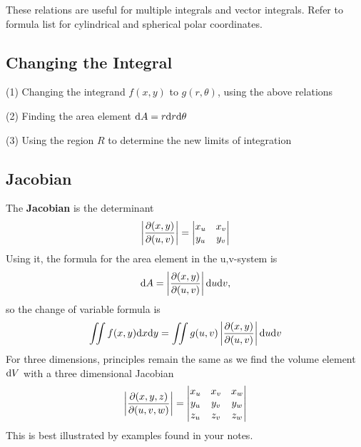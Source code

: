 These relations are useful for multiple integrals and vector integrals. Refer to formula list
for cylindrical and spherical polar coordinates.

\subsection*{Changing the Integral}

(1) Changing the integrand $f(x,y)$ to $g(r,\theta)$, using the above relations

(2) Finding the area element $\differential A = r \differential r \differential \theta$

(3) Using the region $R$ to determine the new limits of integration

\subsection*{Jacobian}

The \textbf{Jacobian} is the determinant
\begin{equation*}
    \left| \pdv{(x,y)}{(u,v)} \right| = \begin{vmatrix} x_u & x_v  \\ y_u & y_v \end{vmatrix}
\end{equation*}
Using it, the formula for the area element in the u,v-system is
\begin{equation*}
    \differential A = \left| \pdv{(x,y)}{(u,v)} \right| \differential u \differential v,
\end{equation*}
so the change of variable formula is 
\begin{equation*}
    \iint f(x,y)\differential x \differential y = \iint g(u,v) \left| \pdv{(x,y)}{(u,v)} \right| \differential u \differential v
\end{equation*}
For three dimensions, principles remain the same as we find the volume element $\differential V$ with a three dimensional Jacobian
\begin{equation*}
    \left| \pdv{(x,y,z)}{(u,v,w)} \right| = \begin{vmatrix} x_u & x_v & x_w \\ y_u & y_v & y_w \\ z_u  & z_v & z_w \end{vmatrix}
\end{equation*}
This is best illustrated by examples found in your notes.
